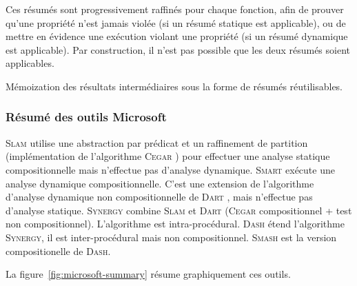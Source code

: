 \documentclass[french]{spimufcphdthesis}
\begin{document}
Ces résumés sont progressivement raffinés pour chaque fonction, afin de prouver
qu'une propriété n'est jamais violée (si un résumé statique est applicable), ou
de mettre en évidence une exécution violant une propriété (si un résumé
dynamique est applicable). Par construction, il n'est pas
possible que les deux résumés soient applicables.


\begin{definition}
Mémoization des résultats intermédiaires sous la forme de résumés réutilisables.
\end{definition}


\subsubsection{Résumé des outils Microsoft}


\textsc{Slam} \cite{SLAM} utilise une abstraction par prédicat et un raffinement
de partition (implémentation de l'algorithme \textsc{Cegar} \cite{CEGAR}) pour
effectuer une analyse statique compositionnelle mais n'effectue pas d'analyse
dynamique. \textsc{Smart} \cite{SMART} exécute une analyse dynamique
compositionnelle. C'est une extension de l'algorithme d'analyse dynamique non
compositionnelle de \textsc{Dart} \cite{DART}, mais n'effectue pas d'analyse
statique. \textsc{Synergy} \cite{SYNERGY} combine \textsc{Slam} \cite{SLAM} et
\textsc{Dart} \cite{DART} (\textsc{Cegar} compositionnel + test non
compositionnel). L'algorithme est intra-procédural. \textsc{Dash} \cite{DASH}
étend l'algorithme \textsc{Synergy}, il est inter-procédural mais non
compositionnel. \textsc{Smash} \cite{SMASH} est la version compositionelle de
\textsc{Dash}.



La figure~\ref{fig:microsoft-summary} résume graphiquement ces outils.
\end{document}
